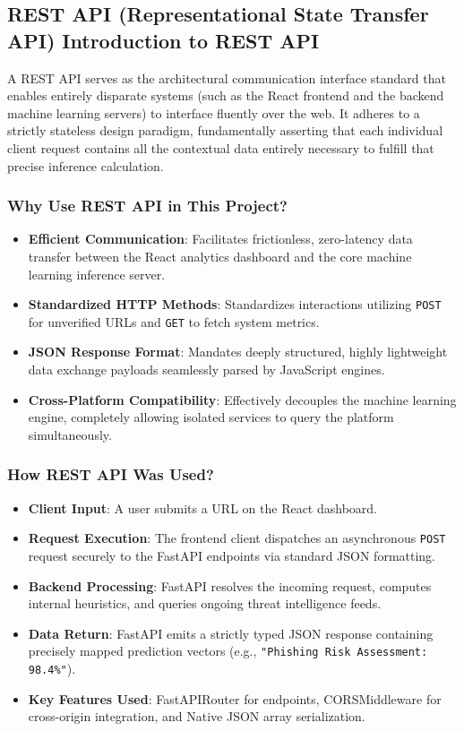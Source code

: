 \subsection{REST API (Representational State Transfer API) Introduction to REST API}
\noindent
A REST API serves as the architectural communication interface standard that enables entirely disparate systems (such as the React frontend and the backend machine learning servers) to interface fluently over the web. It adheres to a strictly stateless design paradigm, fundamentally asserting that each individual client request contains all the contextual data entirely necessary to fulfill that precise inference calculation.

\subsubsection*{Why Use REST API in This Project?}

\begin{itemize}
\item \textbf{Efficient Communication}: Facilitates frictionless, zero-latency data transfer between the React analytics dashboard and the core machine learning inference server.
\item \textbf{Standardized HTTP Methods}: Standardizes interactions utilizing \texttt{POST} for unverified URLs and \texttt{GET} to fetch system metrics.
\item \textbf{JSON Response Format}: Mandates deeply structured, highly lightweight data exchange payloads seamlessly parsed by JavaScript engines.
\item \textbf{Cross-Platform Compatibility}: Effectively decouples the machine learning engine, completely allowing isolated services to query the platform simultaneously.
\end{itemize}

\subsubsection*{How REST API Was Used?}

\begin{itemize}
\item \textbf{Client Input}: A user submits a URL on the React dashboard.
\item \textbf{Request Execution}: The frontend client dispatches an asynchronous \texttt{POST} request securely to the FastAPI endpoints via standard JSON formatting.
\item \textbf{Backend Processing}: FastAPI resolves the incoming request, computes internal heuristics, and queries ongoing threat intelligence feeds.
\item \textbf{Data Return}: FastAPI emits a strictly typed JSON response containing precisely mapped prediction vectors (e.g., \texttt{"Phishing Risk Assessment: 98.4\%"}).
\item \textbf{Key Features Used}: FastAPIRouter for endpoints, CORSMiddleware for cross-origin integration, and Native JSON array serialization.
\end{itemize}

